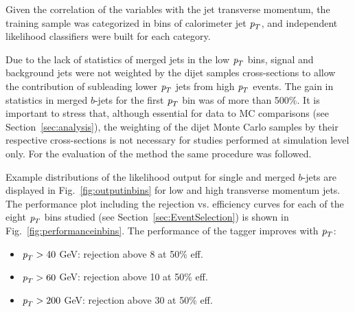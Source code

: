 Given the correlation of the variables with the jet transverse momentum,  the training sample was categorized in bins of calorimeter jet ${\emph{p}_{T}}$, and independent likelihood classifiers were built for each category.  

Due to the lack of statistics 
of merged jets in the low ${\emph{p}_{T}}$ bins, signal and background jets were not weighted by the dijet samples cross-sections to allow the contribution of subleading lower ${\emph{p}_{T}}$ jets from high ${\emph{p}_{T}}$ events. The gain in statistics in merged $b$-jets for the first ${\emph{p}_{T}}$ bin was of more than 500\%.   It is important to stress that, although essential for data to MC comparisons (see Section~\ref{sec:analysis}), the weighting of the dijet Monte Carlo samples by their respective cross-sections is not necessary for studies performed at simulation level only.
For the evaluation of the method the same procedure was followed.

Example distributions of the likelihood output for single and merged $b$-jets are displayed in  Fig.~\ref{fig:outputinbins} for low and high transverse momentum jets.  The performance plot including the rejection vs. efficiency curves for each of the eight ${\emph{p}_{T}}$ bins studied (see Section~\ref{sec:EventSelection}) is shown in Fig.~\ref{fig:performanceinbins}. The performance of the tagger improves with ${\emph{p}_{T}}$:


\begin{itemize}\addtolength{\itemsep}{-0.4\baselineskip}
\item
${\emph{p}_{T}}>40$ GeV: %
rejection above 8 at 50\% eff.
\item
${\emph{p}_{T}}>60$ GeV: %
rejection above 10 at 50\% eff.
\item
${\emph{p}_{T}}>200$ GeV: %
rejection above 30 at 50\% eff.
\end{itemize}


